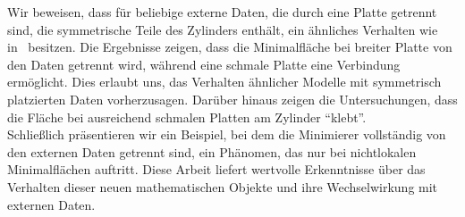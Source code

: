 Wir beweisen, dass für beliebige externe Daten, die durch eine Platte getrennt sind, die
symmetrische Teile des Zylinders enthält, ein ähnliches Verhalten wie
in~\cite{dipierro2020disconnectedness} besitzen. Die Ergebnisse zeigen, dass die Minimalfläche
bei breiter Platte von den Daten getrennt wird, während eine schmale Platte eine Verbindung
ermöglicht. Dies erlaubt uns, das Verhalten ähnlicher Modelle mit symmetrisch platzierten Daten
vorherzusagen. Darüber hinaus zeigen die Untersuchungen, dass die Fläche bei ausreichend schmalen
Platten am Zylinder \enquote{klebt}. \\

Schließlich präsentieren wir ein Beispiel, bei dem die Minimierer vollständig von den externen Daten
getrennt sind, ein Phänomen, das nur bei nichtlokalen Minimalflächen auftritt. Diese Arbeit liefert
wertvolle Erkenntnisse über das Verhalten dieser neuen mathematischen Objekte und ihre
Wechselwirkung mit externen Daten.

